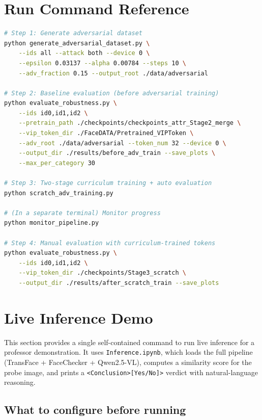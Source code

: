 \documentclass[12pt,a4paper]{article}
\begin{document}
\section{Run Command Reference}

\begin{lstlisting}[language=bash,caption={Complete run sequence}]
# Step 1: Generate adversarial dataset
python generate_adversarial_dataset.py \
    --ids all --attack both --device 0 \
    --epsilon 0.03137 --alpha 0.00784 --steps 10 \
    --adv_fraction 0.15 --output_root ./data/adversarial

# Step 2: Baseline evaluation (before adversarial training)
python evaluate_robustness.py \
    --ids id0,id1,id2 \
    --pretrain_path ./checkpoints/checkpoints_attr_Stage2_merge \
    --vip_token_dir ./FaceDATA/Pretrained_VIPToken \
    --adv_root ./data/adversarial --token_num 32 --device 0 \
    --output_dir ./results/before_adv_train --save_plots \
    --max_per_category 30

# Step 3: Two-stage curriculum training + auto evaluation
python scratch_adv_training.py

# (In a separate terminal) Monitor progress
python monitor_pipeline.py

# Step 4: Manual evaluation with curriculum-trained tokens
python evaluate_robustness.py \
    --ids id0,id1,id2 \
    --vip_token_dir ./checkpoints/Stage3_scratch \
    --output_dir ./results/after_scratch_train --save_plots
\end{lstlisting}

\section{Live Inference Demo}

\noindent This section provides a single self-contained command to run live inference
for a professor demonstration.  It uses \texttt{Inference.ipynb}, which loads the full
pipeline (TransFace + FaceChecker + Qwen2.5-VL), computes a similarity score for the
probe image, and prints a \texttt{<Conclusion>[Yes/No]>} verdict with natural-language
reasoning.

\subsection*{What to configure before running}
\end{document}
